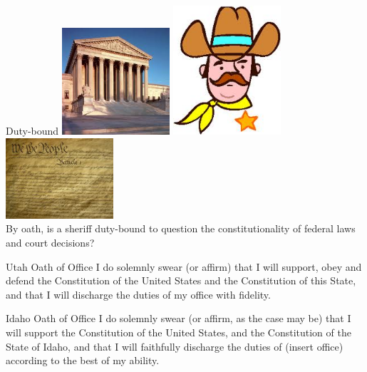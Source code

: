 \documentclass{beamer}
\begin{document}
\begin{frame}{Duty-bound}
    \centering
    \includegraphics[width=0.3\textwidth]{img/court-bldg.png}
    \includegraphics[width=0.3\textwidth]{img/sheriff-clip.png}
    \includegraphics[width=0.3\textwidth]{img/constitution.png} \\
    \vspace{18pt}
    By oath, is a sheriff duty-bound to question the constitutionality of federal laws and court decisions? \\
\end{frame}

\begin{frame}
    \begin{block}{Utah Oath of Office}
    I do solemnly swear (or affirm) that I will support, obey and defend the Constitution of the United States and the Constitution of this State, and that I will discharge the duties of my office with fidelity.
    \end{block}
\end{frame}

\begin{frame}
    \begin{block}{Idaho Oath of Office}
    I do solemnly swear (or affirm, as the case may be) that I will support the Constitution of the United States, and the Constitution of the State of Idaho, and that I will faithfully discharge the duties of (insert office) according to the best of my ability.
    \end{block}
\end{frame}
\end{document}
